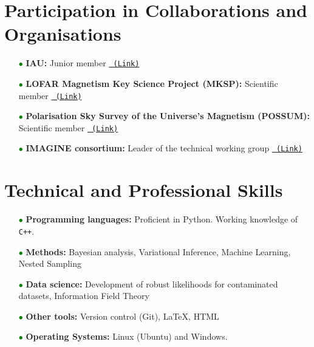 \documentclass[11pt,a4paper,sans, table, dvipsnames]{moderncv}        %
\begin{document}
\vspace{\baselineskip}
\section{Participation in Collaborations and Organisations}
\begin{itemize}
\item[\textcolor{Green}{$\bullet$}] \textbf{IAU: }Junior member \href{https://www.iau.org/administration/membership/individual/19962/}{\texttt{\color{blue} (Link)}}
\item[\textcolor{Green}{$\bullet$}] \textbf{LOFAR Magnetism Key Science Project (MKSP): } Scientific member \href{https://lofar-mksp.org/people/}{\texttt{\color{blue} (Link)}}
\item[\textcolor{Green}{$\bullet$}] \textbf{Polarisation Sky Survey of the Universe's Magnetism (POSSUM): } Scientific member \href{https://possum-survey.org/members/}{\texttt{\color{blue} (Link)}}
\item[\textcolor{Green}{$\bullet$}] \textbf{IMAGINE consortium: } Leader of the technical working group \href{https://www.astro.ru.nl/imagine/imagineprojects.html}{\texttt{\color{blue} (Link)}}
\end{itemize}


\vspace{\baselineskip}
\section{Technical and Professional Skills}
\begin{itemize}

\item[\textcolor{Green}{$\bullet$}] \textbf{Programming languages:} Proficient in Python. Working knowledge of \texttt{C++}.

\vspace{5pt}

\item[\textcolor{Green}{$\bullet$}] \textbf{Methods:} Bayesian analysis, Variational Inference, Machine Learning, Nested Sampling

\vspace{5pt}

\item[\textcolor{Green}{$\bullet$}] \textbf{Data science:}  Development of robust likelihoods for contaminated datasets, Information Field Theory

\vspace{5pt}

\item[\textcolor{Green}{$\bullet$}] \textbf{Other tools:} Version control (Git), \LaTeX{}, HTML

\vspace{5pt}

\item[\textcolor{Green}{$\bullet$}] \textbf{Operating Systems:} Linux (Ubuntu) and Windows.

\end{itemize}
\end{document}
